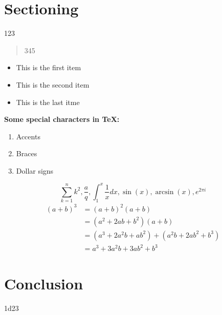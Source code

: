 \documentclass[a4paper,12pt]{article}
\begin{document}
\section{Sectioning}
\begin{center}123 \end{center}
\begin{quote} 345\end{quote}

\begin{itemize}
\item This is the first item
\item This is the second item
\item This is the last itme
\end{itemize}

\smallskip
\textbf{Some special characters in TeX:}\cite{hA70,eM57}
\begin{enumerate}
\item Accents  
\item Braces 
\item Dollar signs 
\end{enumerate}

\begin{equation}
\sum_{k=1}^n k^2, \frac{a}{q}, \int_1^x\frac{1}{x}dx, \sin(x), \arcsin(x), e^{2 \pi i}
\end{equation}
\begin{align*} 
(a+b)^3 &= (a+b)^2(a+b)\\
&=(a^2+2ab+b^2)(a+b)\\
&=(a^3+2a^2b+ab^2) + (a^2b+2ab^2+b^3)\\
&=a^3+3a^2b+3ab^2+b^3
\end{align*}
\section{Conclusion}
1d23
\end{document}
